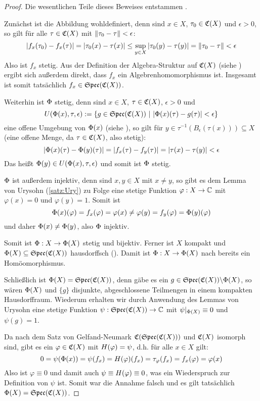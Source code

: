 \begin{proof}Die wesentlichen Teile dieses Beweises entstammen \cite[Bemerkung 2.1.33]{Baer2003}.

Zunächst ist die Abbildung wohldefiniert, denn sind $x \in X$, $\tau_0 \in \mathfrak{C}(X)$ und $\epsilon > 0$, so gilt für alle $\tau \in \mathfrak{C}(X)$ mit $\left\lVert\tau_0 - \tau\right\rVert < \epsilon$:
	\[\left|f_x(\tau_0) - f_x(\tau)\right| = \left|\tau_0(x) - \tau(x)\right| \leq \underset{y \in X}{\sup} \left|\tau_0(y) - \tau(y)\right| = \left\lVert\tau_0 - \tau\right\rVert < \epsilon \]
Also ist $f_x$ stetig. Aus der Definition der Algebra-Struktur auf $\mathfrak{C}(X)$ (siehe ) ergibt sich außerdem direkt, dass $f_x$ ein Algebrenhomomorphismus ist. Insgesamt ist somit tatsächlich $f_x \in \mathfrak{Spec}(\mathfrak{C}(X))$.

Weiterhin ist $\Phi$ stetig, denn sind $x \in X$, $\tau \in \mathfrak{C}(X)$, $\epsilon > 0$ und 
	\[U(\Phi(x), \tau, \epsilon) := \{g \in \mathfrak{Spec}(\mathfrak{C}(X)) ~|~ |\Phi(x)(\tau) - g(\tau)| < \epsilon\}\]
eine offene Umgebung von $\Phi(x)$ (siehe ), so gilt für $y \in \tau^{-1}(B_\epsilon(\tau(x))) \subseteq X$ (eine offene Menge, da $\tau \in \mathfrak{C}(X)$, also stetig):
	\[\left|\Phi(x)(\tau) - \Phi(y)(\tau)\right| = \left|f_x(\tau) - f_y(\tau)\right| = \left|\tau(x) - \tau(y)\right| < \epsilon \]
Das heißt $\Phi(y) \in U(\Phi(x), \tau, \epsilon)$ und somit ist $\Phi$ stetig.

$\Phi$ ist außerdem injektiv, denn sind $x, y \in X$ mit $x \neq y$, so gibt es dem Lemma von Urysohn (\ref{satz:Ury}) zu Folge eine stetige Funktion $\varphi: X \to \mathbb{C}$ mit $\varphi(x) = 0$ und $\varphi(y) = 1$. Somit ist 
	\[\Phi(x)(\varphi) = f_x(\varphi) = \varphi(x) \neq \varphi(y) = f_y(\varphi) = \Phi(y)(\varphi)\]
und daher $\Phi(x) \neq \Phi(y)$, also $\Phi$ injektiv.

Somit ist $\Phi: X \to \Phi(X)$ stetig und bijektiv. Ferner ist $X$ kompakt und $\Phi(X) \subseteq \mathfrak{Spec}(\mathfrak{C}(X))$ hausdorffsch (). Damit ist $\Phi: X \to \Phi(X)$ nach  bereits ein Homöomorphismus.

Schließlich ist $\Phi(X) = \mathfrak{Spec}(\mathfrak{C}(X))$, denn gäbe es ein $g \in \mathfrak{Spec}(\mathfrak{C}(X)) \backslash \Phi(X)$, so wären $\Phi(X)$ und $\{g\}$ disjunkte, abgeschlossene Teilmengen in einem kompakten Hausdorffraum. Wiederum erhalten wir durch Anwendung des Lemmas von Urysohn eine stetige Funktion $\psi: \mathfrak{Spec}(\mathfrak{C}(X)) \to \mathbb{C}$ mit $\psi|_{\Phi(X)} \equiv 0$ und $\psi(g) = 1$. 

Da nach dem Satz von Gelfand-Neumark $\mathfrak{C}(\mathfrak{Spec}(\mathfrak{C}(X)))$ und $\mathfrak{C}(X)$ isomorph sind, gibt es ein $\varphi \in \mathfrak{C}(X)$ mit $H(\varphi) = \psi$, d.h. für alle $x \in X$ gilt:
	\[0 = \psi(\Phi(x)) = \psi(f_x) = H(\varphi)(f_x) = \tau_\varphi(f_x) = f_x(\varphi) = \varphi(x)\]
Also ist $\varphi \equiv 0$ und damit auch $\psi \equiv H(\varphi) \equiv 0$, was ein Wiederspruch zur Definition von $\psi$ ist. Somit war die Annahme falsch und es gilt tatsächlich $\Phi(X) = \mathfrak{Spec}(\mathfrak{C}(X))$.
\end{proof}

